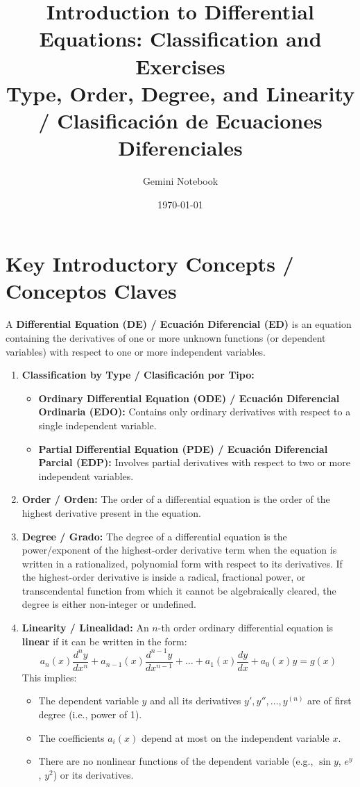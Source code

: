 \documentclass[11pt,letterpaper]{article}
\title{Introduction to Differential Equations: Classification and Exercises\\
\large Type, Order, Degree, and Linearity / Clasificación de Ecuaciones Diferenciales}
\author{Gemini Notebook}
\date{\today}
\begin{document}
\maketitle

\section{Key Introductory Concepts / Conceptos Claves}

A \textbf{Differential Equation (DE) / Ecuación Diferencial (ED)} is an equation containing the derivatives of one or more unknown functions (or dependent variables) with respect to one or more independent variables.

\begin{enumerate}
    \item \textbf{Classification by Type / Clasificación por Tipo:}
    \begin{itemize}
        \item \textbf{Ordinary Differential Equation (ODE) / Ecuación Diferencial Ordinaria (EDO):} Contains only ordinary derivatives with respect to a single independent variable.
        \item \textbf{Partial Differential Equation (PDE) / Ecuación Diferencial Parcial (EDP):} Involves partial derivatives with respect to two or more independent variables.
    \end{itemize}
    
    \item \textbf{Order / Orden:} The order of a differential equation is the order of the highest derivative present in the equation.
    
    \item \textbf{Degree / Grado:} The degree of a differential equation is the power/exponent of the highest-order derivative term when the equation is written in a rationalized, polynomial form with respect to its derivatives. If the highest-order derivative is inside a radical, fractional power, or transcendental function from which it cannot be algebraically cleared, the degree is either non-integer or undefined.
    
    \item \textbf{Linearity / Linealidad:} An $n$-th order ordinary differential equation is \textbf{linear} if it can be written in the form:
    \[
    a_n(x) \frac{d^n y}{dx^n} + a_{n-1}(x) \frac{d^{n-1} y}{dx^{n-1}} + \dots + a_1(x) \frac{dy}{dx} + a_0(x) y = g(x)
    \]
    This implies:
    \begin{itemize}
        \item The dependent variable $y$ and all its derivatives $y', y'', \dots, y^{(n)}$ are of first degree (i.e., power of 1).
        \item The coefficients $a_i(x)$ depend at most on the independent variable $x$.
        \item There are no nonlinear functions of the dependent variable (e.g., $\sin y$, $e^y$, $y^2$) or its derivatives.
    \end{itemize}
\end{enumerate}
\end{document}
